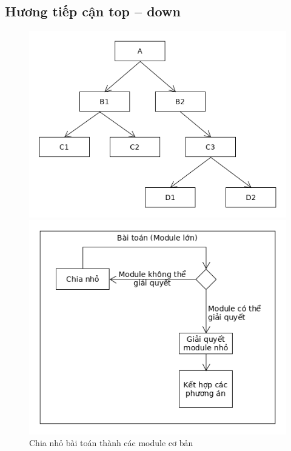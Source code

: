 \documentclass[]{beamer}
\newenvironment{ffr}
               {\begin{frame}{\subsecname}}
               {\end{frame}}
\begin{document}
\begin{ffr}
\subsection{Hương tiếp cận top -- down}
\begin{ffr}
    \begin{figure}
      \hfill
      \begin{minipage}{0.49\textwidth}
        \centering
        \includegraphics[width=\textwidth]{module-con.png}
      \end{minipage}
      \hfill 
      \begin{minipage}{0.49\textwidth}
        \centering
        \includegraphics[width=\textwidth]{chia-nho.png}
      \end{minipage}
      \caption{\label{fig:chia-nho} Chia nhỏ bài toán thành các module cơ bản}
      \hfill
    \end{figure}
\end{ffr}


\end{ffr}
\end{document}
